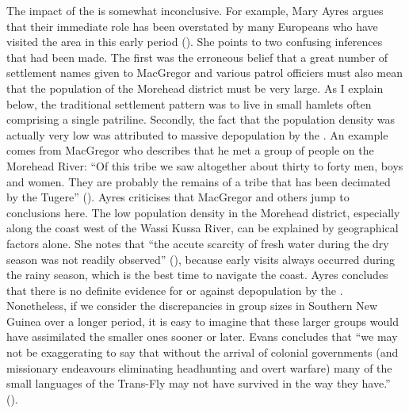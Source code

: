 The impact of the  is somewhat inconclusive. For example, Mary Ayres argues that their immediate role has been overstated by many Europeans who have visited the area in this early period (\citeyear[19]{Ayres:ws}). She points to two confusing inferences that had been made. The first was the erroneous belief that a great number of settlement names given to MacGregor and various patrol officiers must also mean that the population of the Morehead district must be very large. As I explain below, the traditional settlement pattern was to live in small hamlets often comprising a single patriline. Secondly, the fact that the population density was actually very low was attributed to massive depopulation by the . An example comes from MacGregor who describes that he met a group of people on the Morehead River: ``Of this tribe we saw altogether about thirty to forty men, boys and women. They are probably the remains of a tribe that has been decimated by the Tugere'' (\citeyear[74]{MacGregor:1890rep}). Ayres criticises that MacGregor and others jump to conclusions here. The low population density in the Morehead district, especially along the coast west of the Wassi Kussa River, can be explained by geographical factors alone. She notes that ``the accute scarcity of fresh water during the dry season was not readily observed'' (\citeyear[22]{Ayres:ws}), because early visits always occurred during the rainy season, which is the best time to navigate the coast. Ayres concludes that there is no definite evidence for or against depopulation by the . Nonetheless, if we consider the discrepancies in group sizes in Southern New Guinea over a longer period, it is easy to imagine that these larger groups would have assimilated the smaller ones sooner or later. Evans concludes that ``we may not be exaggerating to say that without the arrival of colonial governments (and missionary endeavours eliminating headhunting and overt warfare) many of the small languages of the Trans-Fly may not have survived in the way they have.'' (\citeyear[117]{Evans:2012wp}).%

